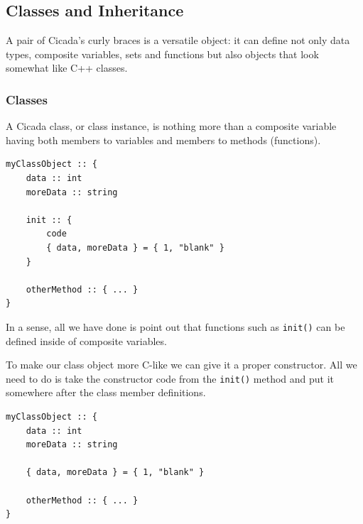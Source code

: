 \documentclass{article}
\newenvironment{code}{
       \begin{list}{}{
               \setlength{\leftmargin}{.4in}
               \setlength{\rightmargin}{0in}
               \setlength{\topsep}{.2in}
       }
       \small
       \item[] }
       { \end{list}   }
\begin{document}









\subsection{Classes and Inheritance}

A pair of Cicada's curly braces is a versatile object:  it can define not only data types, composite variables, sets and functions but also objects that look somewhat like C++ classes.







\subsubsection{Classes}

A Cicada class, or class instance, is nothing more than a composite variable having both members to variables and members to methods (functions).

\begin{code} \begin{verbatim}
myClassObject :: {
    data :: int
    moreData :: string
    
    init :: {
        code
        { data, moreData } = { 1, "blank" }
    }
    
    otherMethod :: { ... }
}
\end{verbatim} \end{code}

\noindent In a sense, all we have done is point out that functions such as \verb#init()# can be defined inside of composite variables.

To make our class object more C-like we can give it a proper constructor.  All we need to do is take the constructor code from the \verb#init()# method and put it somewhere after the class member definitions.

\begin{code} \begin{verbatim}
myClassObject :: {
    data :: int
    moreData :: string
    
    { data, moreData } = { 1, "blank" }
    
    otherMethod :: { ... }
}
\end{verbatim} \end{code}
\end{document}
